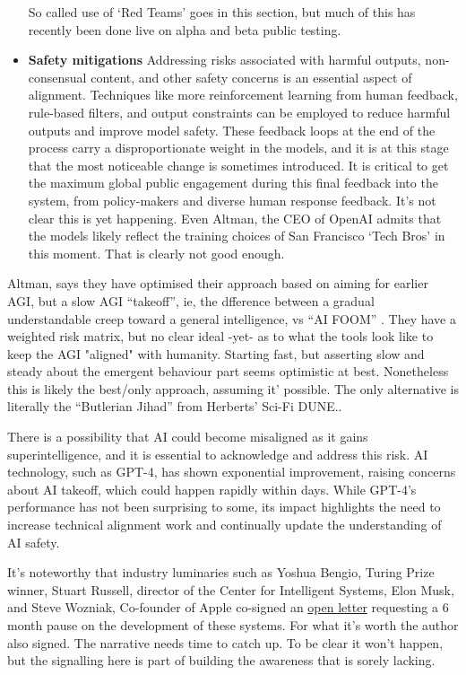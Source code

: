 \begin{itemize}
So called use of `Red Teams' goes in this section, but much of this has recently been done live on alpha and beta public testing. 
\item \textbf{Safety mitigations} Addressing risks associated with harmful outputs, non-consensual content, and other safety concerns is an essential aspect of alignment. Techniques like more reinforcement learning from human feedback, rule-based filters, and output constraints can be employed to reduce harmful outputs and improve model safety. These feedback loops at the end of the process carry a disproportionate weight in the models, and it is at this stage that the most noticeable change is sometimes introduced. It is critical to get the maximum global public engagement during this final feedback into the system, from policy-makers and diverse human response feedback. It's not clear this is yet happening. Even Altman, the CEO of OpenAI admits that the models likely reflect the training choices of San Francisco `Tech Bros' in this moment. That is clearly not good enough.
\end{itemize}
Altman, says they have optimised their approach based on aiming for earlier AGI, but a slow AGI ``takeoff'', ie, the dfference between a gradual understandable creep toward a general intelligence, vs ``AI FOOM'' \cite{yudkowsky2008hanson}. They have a weighted risk matrix, but no clear ideal -yet- as to what the tools look like to keep the AGI "aligned" with humanity. Starting fast, but asserting slow and steady about the emergent behaviour part seems optimistic at best. Nonetheless this is likely the best/only approach, assuming it' possible. The only alternative is literally the ``Butlerian Jihad'' from Herberts' Sci-Fi DUNE.\cite{song2018preventing}.\par
There is a possibility that AI could become misaligned as it gains superintelligence, and it is essential to acknowledge and address this risk. 
AI technology, such as GPT-4, has shown exponential improvement, raising concerns about AI takeoff, which could happen rapidly within days. While GPT-4's performance has not been surprising to some, its impact highlights the need to increase technical alignment work and continually update the understanding of AI safety.\par
It's noteworthy that industry luminaries such as Yoshua Bengio, Turing Prize winner, Stuart Russell, director of the Center for Intelligent Systems, Elon Musk, and Steve Wozniak, Co-founder of Apple co-signed an \href{https://futureoflife.org/open-letter/pause-giant-ai-experiments/}{open letter} requesting a 6 month pause on the development of these systems. For what it's worth the author also signed. The narrative needs time to catch up. To be clear it won't happen, but the signalling here is part of building the awareness that is sorely lacking. 
